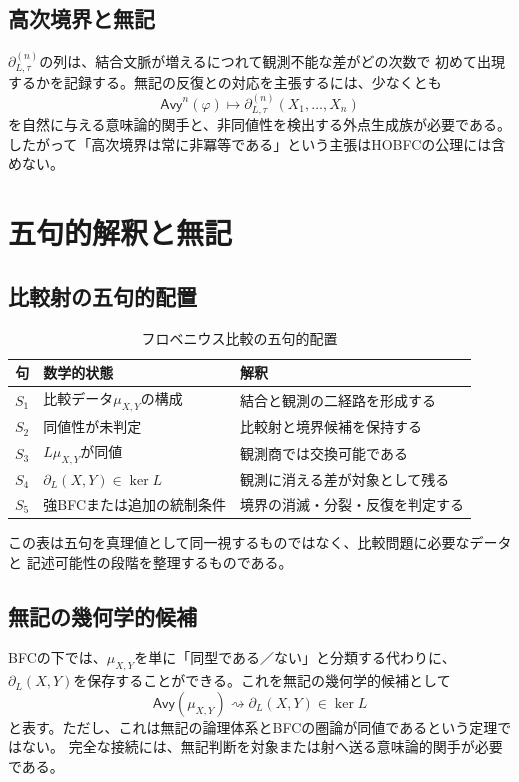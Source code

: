 \documentclass[11pt,a4paper]{ltjsarticle}
\theoremstyle{definition}
\theoremstyle{remark}
\newcommand{\Boundary}{\partial_L}
\newcommand{\Avyakata}{\mathsf{Avy}}
\begin{document}
\subsection{高次境界と無記}

$\partial_{L,\tau}^{(n)}$の列は、結合文脈が増えるにつれて観測不能な差がどの次数で
初めて出現するかを記録する。無記の反復との対応を主張するには、少なくとも
\[
 \Avyakata^n(\varphi)
 \longmapsto
 \partial_{L,\tau}^{(n)}(X_1,\ldots,X_n)
\]
を自然に与える意味論的関手と、非同値性を検出する外点生成族が必要である。
したがって「高次境界は常に非冪等である」という主張はHOBFCの公理には含めない。

\section{五句的解釈と無記}

\subsection{比較射の五句的配置}

\begin{table}[htbp]
\centering
\caption{フロベニウス比較の五句的配置}
\small
\begin{tabularx}{\textwidth}{@{}c >{\raggedright\arraybackslash}p{} >{\raggedright\arraybackslash}X@{}}
\toprule
句 & 数学的状態 & 解釈 \\
\midrule
$S_1$ & 比較データ$\mu_{X,Y}$の構成 & 結合と観測の二経路を形成する \\
$S_2$ & 同値性が未判定 & 比較射と境界候補を保持する \\
$S_3$ & $L\mu_{X,Y}$が同値 & 観測商では交換可能である \\
$S_4$ & $\Boundary(X,Y)\in\ker L$ & 観測に消える差が対象として残る \\
$S_5$ & 強BFCまたは追加の統制条件 & 境界の消滅・分裂・反復を判定する \\
\bottomrule
\end{tabularx}
\end{table}

この表は五句を真理値として同一視するものではなく、比較問題に必要なデータと
記述可能性の段階を整理するものである。

\subsection{無記の幾何学的候補}

BFCの下では、$\mu_{X,Y}$を単に「同型である／ない」と分類する代わりに、
$\Boundary(X,Y)$を保存することができる。これを無記の幾何学的候補として
\[
 \Avyakata(\mu_{X,Y})\rightsquigarrow\Boundary(X,Y)\in\ker L
\]
と表す。ただし、これは無記の論理体系とBFCの圏論が同値であるという定理ではない。
完全な接続には、無記判断を対象または射へ送る意味論的関手が必要である。
\end{document}
